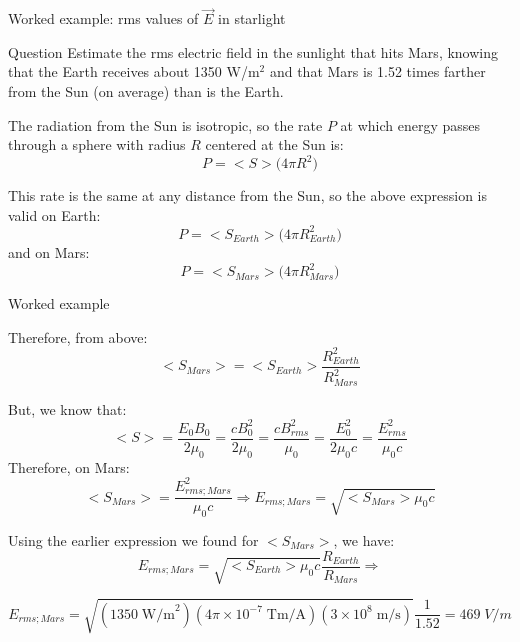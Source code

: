 {
\problemslide

%
%
%
%

\begin{frame}{Worked example: rms values of $\vec{E}$ in starlight}

\begin{blockexmplque}{Question}
  Estimate the rms electric field in the sunlight that hits Mars,
  knowing that the Earth receives about 1350 W/m$^2$ and that
  Mars is 1.52 times farther from the Sun (on average) than is
  the Earth.
\end{blockexmplque}

The radiation from the Sun is isotropic,
so the rate $P$ at which energy passes through a sphere with radius $R$
centered at the Sun is:
\begin{equation*}
    P = <S> \Big( 4\pi R^2 \Big)
\end{equation*}

This rate is the same at any distance from the Sun,
so the above expression is valid on Earth:
\begin{equation*}
    P = <S_{Earth}> \Big( 4\pi R_{Earth}^2 \Big)
\end{equation*}
and on Mars:
\begin{equation*}
    P = <S_{Mars}> \Big( 4\pi R_{Mars}^2 \Big)
\end{equation*}

\end{frame}

%
%
%
%

\begin{frame}{Worked example}

Therefore, from above:
\begin{equation*}
   <S_{Mars}> = <S_{Earth}> \frac{R_{Earth}^2}{R_{Mars}^2}
\end{equation*}

But, we know that:
\begin{equation*}
  <S> = \frac{E_0 B_0}{2\mu_0}
      = \frac{c B_0^2}{2\mu_0} = \frac{c B_{rms}^2}{\mu_0}
      = \frac{E_0^2}{2\mu_0 c} = \frac{E_{rms}^2}{\mu_0 c}
\end{equation*}
Therefore, on Mars:
\begin{equation*}
  <S_{Mars}> = \frac{E_{rms;Mars}^2}{\mu_0 c} \Rightarrow
  E_{rms;Mars} = \sqrt{<S_{Mars}> \mu_0 c}
\end{equation*}

Using the earlier expression we found for $<S_{Mars}>$, we have:
\begin{equation*}
  E_{rms;Mars} = \sqrt{<S_{Earth}> \mu_0 c} \frac{R_{Earth}}{R_{Mars}} \Rightarrow
\end{equation*}

\vspace{-0.2cm}
\begin{equation*}
  E_{rms;Mars} =
   \sqrt{(1350 \; \text{W/m}^2) (4\pi \times 10^{-7} \; \text{Tm/A}) (3\times 10^8 \; \text{m/s})}
   \frac{1}{1.52} = 469 \; V/m
\end{equation*}

\end{frame}

} %

